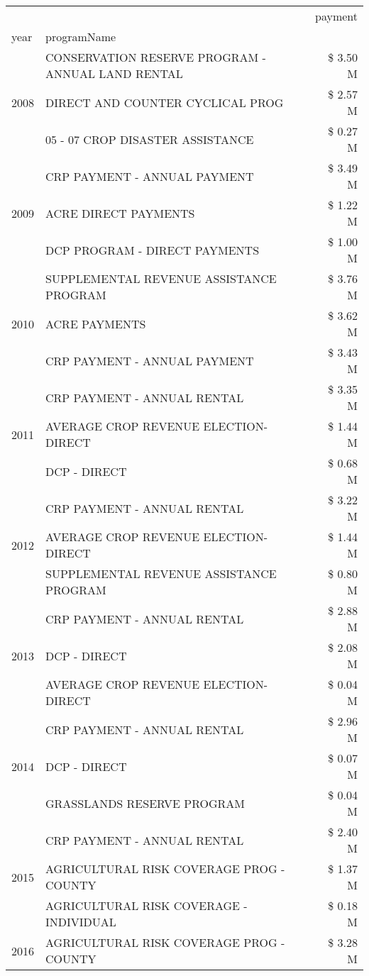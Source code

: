 \begin{tabular}{llr}
\toprule
 &  & payment \\
year & programName &  \\
\midrule
\multirow[t]{3}{*}{2008} & CONSERVATION RESERVE PROGRAM - ANNUAL LAND RENTAL & \$ 3.50 M \\
 & DIRECT AND COUNTER CYCLICAL PROG & \$ 2.57 M \\
 & 05 - 07 CROP DISASTER ASSISTANCE & \$ 0.27 M \\
\cline{1-3}
\multirow[t]{3}{*}{2009} & CRP PAYMENT - ANNUAL PAYMENT & \$ 3.49 M \\
 & ACRE DIRECT PAYMENTS & \$ 1.22 M \\
 & DCP PROGRAM - DIRECT PAYMENTS & \$ 1.00 M \\
\cline{1-3}
\multirow[t]{3}{*}{2010} & SUPPLEMENTAL REVENUE ASSISTANCE PROGRAM & \$ 3.76 M \\
 & ACRE PAYMENTS & \$ 3.62 M \\
 & CRP PAYMENT - ANNUAL PAYMENT & \$ 3.43 M \\
\cline{1-3}
\multirow[t]{3}{*}{2011} & CRP PAYMENT - ANNUAL RENTAL & \$ 3.35 M \\
 & AVERAGE CROP REVENUE ELECTION-DIRECT & \$ 1.44 M \\
 & DCP - DIRECT & \$ 0.68 M \\
\cline{1-3}
\multirow[t]{3}{*}{2012} & CRP PAYMENT - ANNUAL RENTAL & \$ 3.22 M \\
 & AVERAGE CROP REVENUE ELECTION-DIRECT & \$ 1.44 M \\
 & SUPPLEMENTAL REVENUE ASSISTANCE PROGRAM & \$ 0.80 M \\
\cline{1-3}
\multirow[t]{3}{*}{2013} & CRP PAYMENT - ANNUAL RENTAL & \$ 2.88 M \\
 & DCP - DIRECT & \$ 2.08 M \\
 & AVERAGE CROP REVENUE ELECTION-DIRECT & \$ 0.04 M \\
\cline{1-3}
\multirow[t]{3}{*}{2014} & CRP PAYMENT - ANNUAL RENTAL & \$ 2.96 M \\
 & DCP - DIRECT & \$ 0.07 M \\
 & GRASSLANDS RESERVE PROGRAM & \$ 0.04 M \\
\cline{1-3}
\multirow[t]{3}{*}{2015} & CRP PAYMENT - ANNUAL RENTAL & \$ 2.40 M \\
 & AGRICULTURAL RISK COVERAGE PROG - COUNTY & \$ 1.37 M \\
 & AGRICULTURAL RISK COVERAGE - INDIVIDUAL & \$ 0.18 M \\
\cline{1-3}
\multirow[t]{3}{*}{2016} & AGRICULTURAL RISK COVERAGE PROG - COUNTY & \$ 3.28 M \\

\end{tabular}
